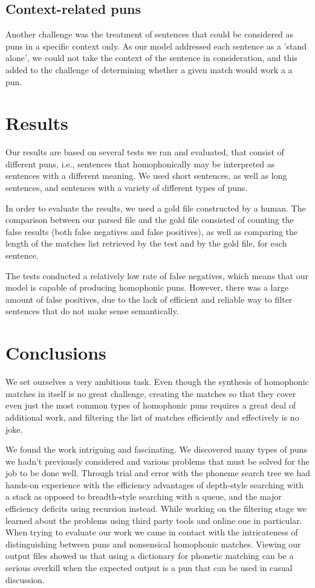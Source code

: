 \documentclass[11pt,a4paper]{article}
\begin{document}
\subsection{Context-related puns}
Another challenge was the treatment of sentences that could be considered as puns in a specific context only. As our model addressed each sentence as a 'stand alone', we could not take the context of the sentence in consideration, and this added to the challenge of determining whether a given match would work a a pun.


\section{Results}
Our results are based on several tests we ran and evaluated, that consist of different puns, i.e., sentences that homophonically may be interpreted as sentences with a different meaning. We used short sentences, as well as long sentences, and sentences with a variety of different types of puns.

In order to evaluate the results, we used a gold file constructed by a human. The comparison between our parsed file and the gold file consisted of counting the false results (both false negatives and false positives), as well as comparing the length of the matches list retrieved by the test and by the gold file, for each sentence.

The tests conducted a relatively low rate of false negatives, which means that our model is capable of producing homophonic puns. However, there was a large amount of false positives, due to the lack of efficient and reliable way to filter sentences that do not make sense semantically.

\section{Conclusions}

We set ourselves a very ambitious task. Even though the synthesis of homophonic matches in itself is no great challenge, creating the matches so that they cover even just the most common types of homophonic puns requires a great deal of additional work, and filtering the list of matches efficiently and effectively is no joke.

We found the work intriguing and fascinating. We discovered many types of puns we hadn't previously considered and various problems that must be solved for the job to be done well. Through trial and error with the phoneme search tree we had hands-on experience with the efficiency advantages of depth-style searching with a stack as opposed to breadth-style searching with a queue, and the major efficiency deficits using recursion instead. While working on the filtering stage we learned about the problems using third party tools and online one in particular. When trying to evaluate our work we came in contact with the intricateness of distinguishing between puns and nonsensical homophonic matches. Viewing our output files showed us that using a dictionary for phonetic matching can be a serious overkill when the expected output is a pun that can be used in casual discussion.
\end{document}
